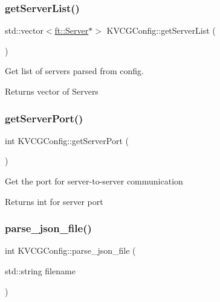 \subsubsection{\texorpdfstring{get\+Server\+List()}{getServerList()}}
{\footnotesize\ttfamily std\+::vector$<$\mbox{\hyperlink{classft_1_1Server}{ft\+::\+Server}}$\ast$$>$ K\+V\+C\+G\+Config\+::get\+Server\+List (\begin{DoxyParamCaption}{ }\end{DoxyParamCaption})\hspace{0.3cm}{\ttfamily [inline]}}

Get list of servers parsed from config.

\begin{DoxyReturn}{Returns}
vector of Servers 
\end{DoxyReturn}
\mbox{\label{classKVCGConfig_a971fafd747cbe1c95f1253d80e5549c6}} 
\subsubsection{\texorpdfstring{get\+Server\+Port()}{getServerPort()}}
{\footnotesize\ttfamily int K\+V\+C\+G\+Config\+::get\+Server\+Port (\begin{DoxyParamCaption}{ }\end{DoxyParamCaption})\hspace{0.3cm}{\ttfamily [inline]}}

Get the port for server-\/to-\/server communication

\begin{DoxyReturn}{Returns}
int for server port 
\end{DoxyReturn}
\mbox{\label{classKVCGConfig_a47206f279489aacccb9200f0bf9b36cf}} 
\subsubsection{\texorpdfstring{parse\+\_\+json\+\_\+file()}{parse\_json\_file()}}
{\footnotesize\ttfamily int K\+V\+C\+G\+Config\+::parse\+\_\+json\+\_\+file (\begin{DoxyParamCaption}\item[{std\+::string}]{filename }\end{DoxyParamCaption})}

